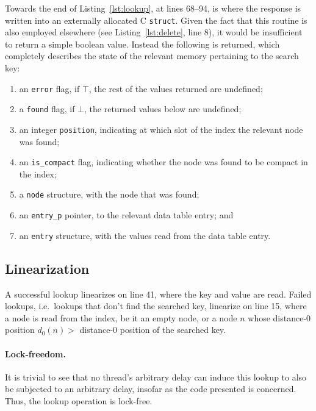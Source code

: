 Towards the end of Listing~\ref{lst:lookup}, at lines 68--94, is where the response is written into an externally allocated C \texttt{struct}.
Given the fact that this routine is also employed elsewhere (see Listing~\ref{lst:delete}, line 8), it would be insufficient to return a simple boolean value.
Instead the following is returned, which completely describes the state of the relevant memory pertaining to the search key:
\begin{enumerate}
	\item an \texttt{error} flag, if $\top$, the rest of the values returned are undefined;
	\item a \texttt{found} flag, if $\bot$, the returned values below are undefined;
	\item an integer \texttt{position}, indicating at which slot of the index the relevant node was found;
	\item an \texttt{{is\_compact}} flag, indicating whether the node was found to be compact in the index;
	\item a \texttt{node} structure, with the node that was found;
	\item an \texttt{{entry\_p}} pointer, to the relevant data table entry; and
	\item an \texttt{entry} structure, with the values read from the data table entry.
\end{enumerate}



\subsection{Linearization}\label{subsec:lookup-linearization}

A successful lookup linearizes on line 41, where the key and value are read.
Failed lookups, i.e.\ lookups that don't find the searched key, linearize on line 15, where a node is read from the index, be it an empty node, or a node $n$ whose distance-0 position $d_0(n) >$ distance-0 position of the searched key.


\paragraph{Lock-freedom.}

It is trivial to see that no thread's arbitrary delay can induce this lookup to also be subjected to an arbitrary delay, insofar as the code presented is concerned.
Thus, the lookup operation is lock-free.


